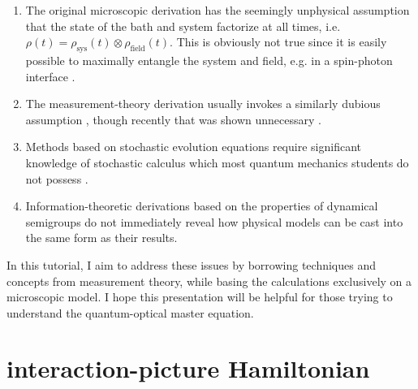 \documentclass[%
 onecolumn,
 notitlepage,
 longbibliography,
 amsmath,amssymb,
 aps,
 pra,
 10pt,
]{revtex4-1}
\begin{document}
\begin{enumerate}
\item The original microscopic derivation \cite{carmichael2009open} has the seemingly unphysical assumption that the state of the bath and system factorize at all times, i.e. $\rho(t)=\rho_\text{sys}(t)\otimes\rho_\text{field}(t)$. This is obviously not true since it is easily possible to maximally entangle the system and field, e.g. in a spin-photon interface \cite{gao2012observation,yao2005theory}.
\item The measurement-theory derivation usually invokes a similarly dubious assumption \cite{jacobs2014quantum,wiseman2009quantum}, though recently that was shown unnecessary \cite{gross2017qubit}.
\item Methods based on stochastic evolution equations require significant knowledge of stochastic calculus which most quantum mechanics students do not possess \cite{gardiner2004quantum}.
\item Information-theoretic derivations based on the properties of dynamical semigroups \cite{breuer2002theory,haroche2006exploring} do not immediately reveal how physical models can be cast into the same form as their results.
\end{enumerate}
In this tutorial, I aim to address these issues by borrowing techniques and concepts from measurement theory, while basing the calculations exclusively on a microscopic model. I hope this presentation will be helpful for those trying to understand the quantum-optical master equation.

\section{interaction-picture Hamiltonian}
\end{document}
